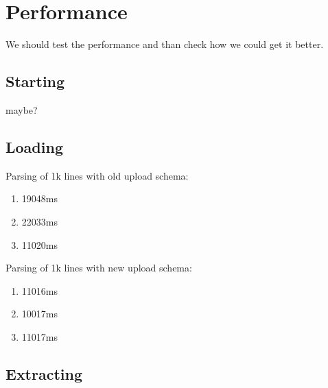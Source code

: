 \section{Performance}
We should test the performance and than check how we could get it better.

\subsection{Starting}
maybe?

\subsection{Loading}
Parsing of 1k lines with old upload schema:
\begin{enumerate}
  \item 19048ms
  \item 22033ms
  \item 11020ms
\end{enumerate}

Parsing of 1k lines with new upload schema:
\begin{enumerate}
  \item 11016ms
  \item 10017ms
  \item 11017ms
\end{enumerate}
\subsection{Extracting}
